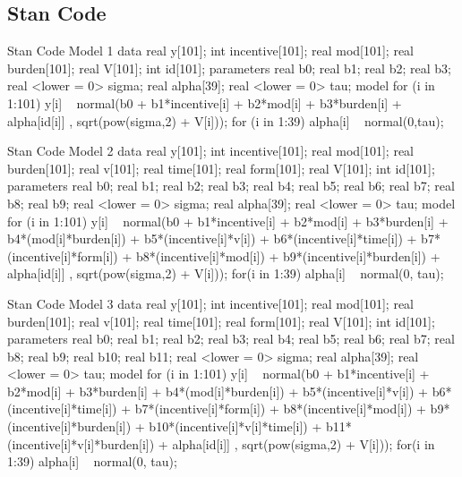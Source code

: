 \documentclass{article}
\begin{document}
\subsection{Stan Code}
\begin{sexylisting}{Stan Code Model 1}
data{
  real y[101];
  int incentive[101];
  real mod[101];
  real burden[101];
  real V[101];
  int id[101];
}
parameters{
  real b0;
  real b1;
  real b2;
  real b3;
  real <lower = 0> sigma;
  real alpha[39];
  real <lower = 0> tau;
}
model{
for (i in 1:101){
    y[i] ~ normal(b0 + b1*incentive[i] + b2*mod[i]
                  + b3*burden[i] + alpha[id[i]] , 
                  sqrt(pow(sigma,2) + V[i]));
  }
for (i in 1:39){
  alpha[i] ~ normal(0,tau);
}
}
\end{sexylisting}
\begin{sexylisting}{Stan Code Model 2}
data{
  real y[101];
  int incentive[101];
  real mod[101];
  real burden[101];
  real v[101];
  real time[101];
  real form[101];
  real V[101];
  int id[101];
}
parameters{
  real b0;
  real b1;
  real b2;
  real b3;
  real b4;
  real b5;
  real b6;
  real b7;
  real b8;
  real b9;
  real <lower = 0> sigma;
  real alpha[39];
  real <lower = 0> tau;
}
model{
  for (i in 1:101){
    y[i] ~ normal(b0 + b1*incentive[i] + b2*mod[i]
                  + b3*burden[i] + b4*(mod[i]*burden[i])  
                  + b5*(incentive[i]*v[i])
                  + b6*(incentive[i]*time[i])
                  + b7*(incentive[i]*form[i])
                  + b8*(incentive[i]*mod[i])
                  + b9*(incentive[i]*burden[i])
                  + alpha[id[i]] , 
                  sqrt(pow(sigma,2) + V[i]));
}
  for(i in 1:39)
alpha[i] ~ normal(0, tau);
}
\end{sexylisting}
\begin{sexylisting}{Stan Code Model 3}
data{
  real y[101];
  int incentive[101];
  real mod[101];
  real burden[101];
  real v[101];
  real time[101];
  real form[101];
  real V[101];
  int id[101];
}
parameters{
  real b0;
  real b1;
  real b2;
  real b3;
  real b4;
  real b5;
  real b6;
  real b7;
  real b8;
  real b9;
  real b10;
  real b11;
  real <lower = 0> sigma;
  real alpha[39];
  real <lower = 0> tau;
}
model{
for (i in 1:101){
    y[i] ~ normal(b0 + b1*incentive[i] + b2*mod[i]
                  + b3*burden[i] + b4*(mod[i]*burden[i])  
                  + b5*(incentive[i]*v[i])
                  + b6*(incentive[i]*time[i])
                  + b7*(incentive[i]*form[i])
                  + b8*(incentive[i]*mod[i])
                  + b9*(incentive[i]*burden[i])
                  + b10*(incentive[i]*v[i]*time[i])
                  + b11*(incentive[i]*v[i]*burden[i])
                  + alpha[id[i]] , sqrt(pow(sigma,2) + V[i]));
  }
for(i in 1:39){
    alpha[i] ~ normal(0, tau);}
}
\end{sexylisting}
\end{document}
